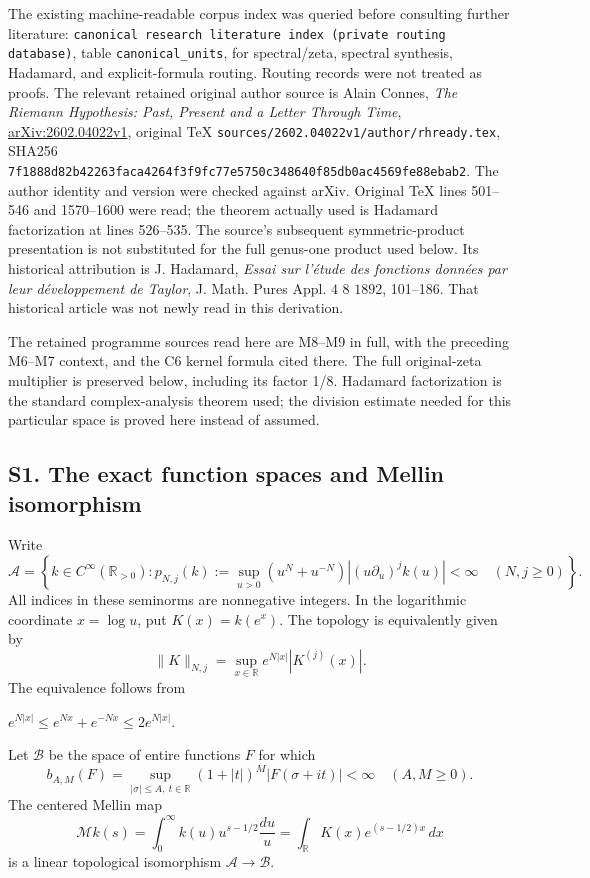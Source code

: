 \documentclass[
]{article}
\begin{document}
The existing machine-readable corpus index was queried before consulting
further literature:
\nolinkurl{canonical research literature index (private routing database)},
table \texttt{canonical\_units}, for spectral/zeta, spectral synthesis,
Hadamard, and explicit-formula routing. Routing records were not treated
as proofs. The relevant retained original author source is Alain Connes,
\emph{The Riemann Hypothesis: Past, Present and a Letter Through Time},
\href{https://arxiv.org/abs/2602.04022v1}{arXiv:2602.04022v1}, original
TeX \nolinkurl{sources/2602.04022v1/author/rhready.tex}, SHA256
\nolinkurl{7f1888d82b42263faca4264f3f9fc77e5750c348640f85db0ac4569fe88ebab2}.
The author identity and version were checked against arXiv. Original TeX
lines 501--546 and 1570--1600 were read; the theorem actually used is
Hadamard factorization at lines 526--535. The source's subsequent
symmetric-product presentation is not substituted for the full genus-one
product used below. Its historical attribution is J. Hadamard,
\emph{Essai sur l'étude des fonctions données par leur développement de
Taylor}, J. Math. Pures Appl. \(4\) 8 \(1892\), 101--186. That
historical article was not newly read in this derivation.

The retained programme sources read here are M8--M9 in full, with the
preceding M6--M7 context, and the C6 kernel formula cited there. The
full original-zeta multiplier is preserved below, including its factor
1/8. Hadamard factorization is the standard complex-analysis theorem
used; the division estimate needed for this particular space is proved
here instead of assumed.

\subsection{S1. The exact function spaces and Mellin
isomorphism}\label{s1.-the-exact-function-spaces-and-mellin-isomorphism}

Write \[
\mathcal A=\left\{k\in C^\infty(\mathbb R_{>0}):
p_{N,j}(k):=\sup_{u>0}(u^N+u^{-N})
\left|(u\partial_u)^j k(u)\right|<\infty\quad(N,j\ge0)\right\}.
\tag{S1.1}
\] All indices in these seminorms are nonnegative integers. In the
logarithmic coordinate \(x=\log u\), put \(K(x)=k(e^x)\). The topology
is equivalently given by \[
\|K\|_{N,j}=\sup_{x\in\mathbb R}e^{N|x|}|K^{(j)}(x)|.
\tag{S1.2}
\] The equivalence follows from

\(e^{N|x|}\le e^{Nx}+e^{-Nx}\le2e^{N|x|}\).

Let \(\mathcal B\) be the space of entire functions \(F\) for which \[
b_{A,M}(F)=\sup_{|\sigma|\le A,\ t\in\mathbb R}
(1+|t|)^M|F(\sigma+it)|<\infty
\quad(A,M\ge0).
\tag{S1.3}
\] The centered Mellin map \[
\mathcal M k(s)=\int_0^\infty k(u)u^{s-1/2}\frac{du}{u}
=\int_{\mathbb R}K(x)e^{(s-1/2)x}\,dx
\tag{S1.4}
\] is a linear topological isomorphism \(\mathcal A\to\mathcal B\).
\end{document}
